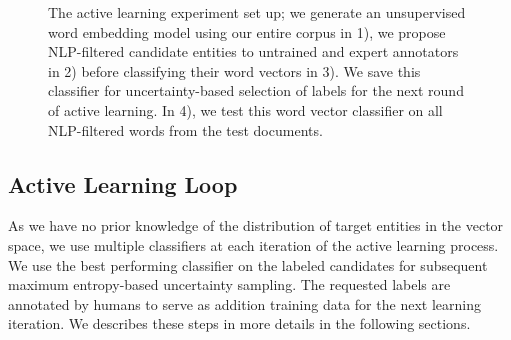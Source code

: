 \begin{figure}[!t]
\centering
{}
\caption{\label{fig:current} The active learning experiment set up; we generate an unsupervised word embedding model using our entire corpus in 1), we propose NLP-filtered candidate entities to untrained and expert annotators in 2) before classifying their word vectors in 3). We save this classifier for uncertainty-based selection of labels for the next round of active learning. In 4), we test this word vector classifier on all NLP-filtered words from the test documents. 
}
\end{figure}

\subsection{Active Learning Loop}
As we have no prior knowledge of the distribution of target entities in the vector space, 
we use multiple classifiers at each iteration of the active learning process. 
We use the best performing classifier on the labeled candidates for subsequent maximum entropy-based uncertainty sampling. 
The requested labels are annotated by humans to serve as addition training data for the next learning iteration. 
We describes these steps in more details in the following sections.

